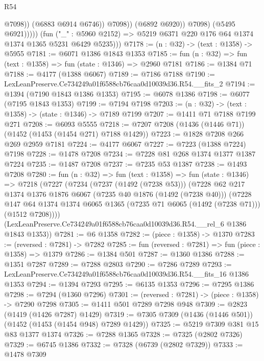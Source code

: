 \begin{lexlean}{R54}
\begin{coremodule}
                              @7098))
                          (@6883 @6914 @6746))
                        @7098))
                    (@6892 @6920))
                  @7098)
                (@5495 @6921)))))
        (fun ("_" : @5960 @2152) => @5219 @6371 @220 @176 @64 @1374 @1374 @1365 @5231 @6429 @5235)))
@7178 := (n : @32) -> (text : @1358) -> @5955
@7181 := @6071 @1386 @1843 @1353
@7185 := fun (n : @32) => fun (text : @1358) => fun (state : @1346) => @2960 @7181
@7186 := @1384 @71
@7188 := @4177 (@1388 @6067)
@7189 := @7186 @7188
@7190 := LexLeanPreserve.Ce734249a01f6588cb76caa0d10039d36.R54.__fits_2
@7194 := @1394 (@7190 @1843 @1386 @1353)
@7195 := @6078 @1386
@7198 := @6077 (@7195 @1843 @1353)
@7199 := @7194 @7198
@7203 := (n : @32) -> (text : @1358) -> (state : @1346) -> @7189 @7199
@7207 := @1411 @71 @7188 @7199 @271
@7208 := @6093 @5555
@7218 := @7207 @7208 (@1436 (@1446 @71)) (@1452 (@1453 (@1454 @271) @7188 @1429))
@7223 := @1828 @7208 @266 @269 @2959 @7181
@7224 := @4177 @6067
@7227 := @7223 (@1388 @7224) @7198
@7228 := @1478 @7208
@7234 := @7228 @81 @268 @1374 @1377 @1387 @7224
@7235 := @1487 @7208
@7237 := @7235 @53 @1387
@7238 := @1493 @7208
@7280 := fun (n : @32) =>
  fun (text : @1358) =>
  fun (state : @1346) =>
  @7218
    (@7227
      (@7234
        (@7237 (@1492 (@7238 @53)))
        (@7228
          @62
          @217
          @1374
          @1376
          @1876
          @6067
          (@7235 @40 @1876 (@1492 (@7238 @40)))
          (@7228
            @147
            @64
            @1374
            @1374
            @6065
            @1365
            (@7235 @71 @6065 (@1492 (@7238 @71)))
            (@1512 @7208))))
      (LexLeanPreserve.Ce734249a01f6588cb76caa0d10039d36.R54.__rel_6 @1386 @1843 @1353))
@7281 := @6 @1358
@7282 := (piece : @1358) -> @1370
@7283 := (reversed : @7281) -> @7282
@7285 := fun (reversed : @7281) => fun (piece : @1358) => @1379
@7286 := @1384 @501
@7287 := @1360 @1386
@7288 := @1351 @7287
@7289 := @7288 @2803
@7290 := @7286 @7289
@7293 := LexLeanPreserve.Ce734249a01f6588cb76caa0d10039d36.R54.__fits_16 @1386 @1353
@7294 := @1394 @7293
@7295 := @6135 @1353
@7296 := @7295 @1386
@7298 := @7294 (@1360 @7296)
@7301 := (reversed : @7281) -> (piece : @1358) -> @7290 @7298
@7305 := @1411 @501 @7289 @7298 @948
@7309 := @2823 (@1419 (@1426 @7287) @1429)
@7319 := @7305 @7309 (@1436 (@1446 @501)) (@1452 (@1453 (@1454 @948) @7289 @1429))
@7325 := @5219 @7309 @381 @15 @83 @1377 @1374
@7326 := @7288 @1365
@7328 := @7325 (@2802 @7326)
@7329 := @6745 @1386
@7332 := @7328 (@6739 (@2802 @7329))
@7333 := @1478 @7309

\end{coremodule}
\end{lexlean}
